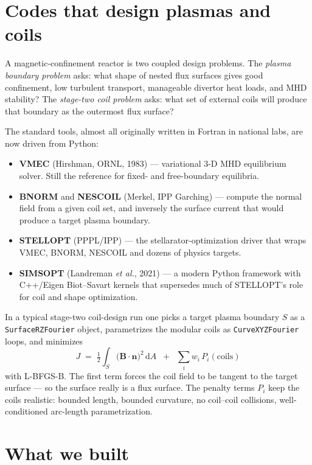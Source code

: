 \documentclass[11pt,a4paper]{article}
\begin{document}
\section*{Codes that design plasmas and coils}

A magnetic-confinement reactor is two coupled design problems. The
\emph{plasma boundary problem} asks: what shape of nested flux surfaces
gives good confinement, low turbulent transport, manageable divertor heat
loads, and MHD stability? The \emph{stage-two coil problem} asks: what set
of external coils will produce that boundary as the outermost flux
surface?

The standard tools, almost all originally written in Fortran in national
labs, are now driven from Python:

\begin{itemize}
  \item \textbf{VMEC} (Hirshman, ORNL, 1983) --- variational 3-D MHD
    equilibrium solver. Still the reference for fixed- and free-boundary
    equilibria.
  \item \textbf{BNORM} and \textbf{NESCOIL} (Merkel, IPP Garching) ---
    compute the normal field from a given coil set, and inversely the
    surface current that would produce a target plasma boundary.
  \item \textbf{STELLOPT} (PPPL/IPP) --- the stellarator-optimization
    driver that wraps VMEC, BNORM, NESCOIL and dozens of physics targets.
  \item \textbf{SIMSOPT} (Landreman \emph{et al.}, 2021) --- a modern
    Python framework with C++/Eigen Biot--Savart kernels that supersedes
    much of STELLOPT's role for coil and shape optimization.
\end{itemize}

In a typical stage-two coil-design run one picks a target plasma boundary
$S$ as a \texttt{SurfaceRZFourier} object, parametrizes the modular coils
as \texttt{CurveXYZFourier} loops, and minimizes
\[
  J \;=\; \tfrac{1}{2}\int_{S}\!\bigl(\mathbf{B}\cdot\hat{\mathbf{n}}\bigr)^{2}\,\mathrm{d}A
     \;\;+\;\; \sum_{i} w_{i}\,P_{i}(\text{coils})
\]
with L-BFGS-B. The first term forces the coil field to be tangent to the
target surface --- so the surface really is a flux surface. The penalty
terms $P_{i}$ keep the coils realistic: bounded length, bounded curvature,
no coil--coil collisions, well-conditioned arc-length parametrization.

\section*{What we built}
\end{document}
